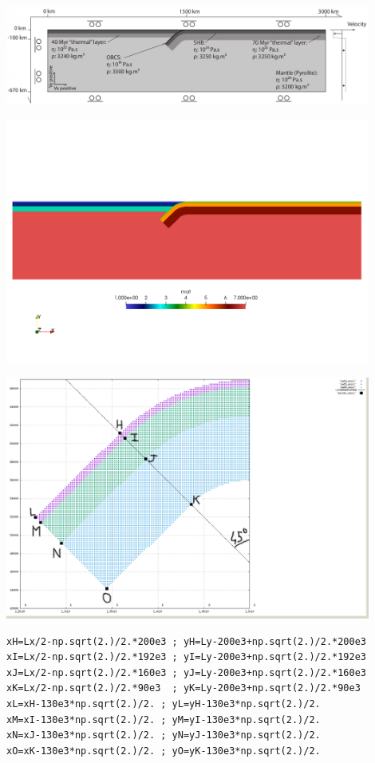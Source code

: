 
\includegraphics[width=12cm]{python_codes/fieldstone_67/images/setup}

\includegraphics[width=12cm]{python_codes/fieldstone_67/images/mats}

\includegraphics[width=12cm]{python_codes/fieldstone_67/images/mats3}

\begin{lstlisting}
xH=Lx/2-np.sqrt(2.)/2.*200e3 ; yH=Ly-200e3+np.sqrt(2.)/2.*200e3
xI=Lx/2-np.sqrt(2.)/2.*192e3 ; yI=Ly-200e3+np.sqrt(2.)/2.*192e3
xJ=Lx/2-np.sqrt(2.)/2.*160e3 ; yJ=Ly-200e3+np.sqrt(2.)/2.*160e3
xK=Lx/2-np.sqrt(2.)/2.*90e3  ; yK=Ly-200e3+np.sqrt(2.)/2.*90e3
xL=xH-130e3*np.sqrt(2.)/2. ; yL=yH-130e3*np.sqrt(2.)/2.
xM=xI-130e3*np.sqrt(2.)/2. ; yM=yI-130e3*np.sqrt(2.)/2.
xN=xJ-130e3*np.sqrt(2.)/2. ; yN=yJ-130e3*np.sqrt(2.)/2.
xO=xK-130e3*np.sqrt(2.)/2. ; yO=yK-130e3*np.sqrt(2.)/2.
\end{lstlisting}

